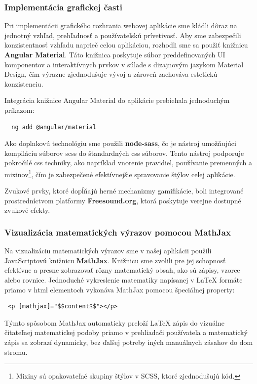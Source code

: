 \subsubsection*{Implementácia grafickej časti}
Pri implementácii grafického rozhrania webovej aplikácie sme kládli dôraz na jednotný vzhľad, prehľadnosť a používateľskú prívetivosť.
 Aby sme zabezpečili konzistentnosť vzhľadu naprieč celou aplikáciou, rozhodli sme sa použiť knižnicu \textbf{Angular Material}.
  Táto knižnica poskytuje súbor preddefinovaných UI komponentov a interaktívnych prvkov v súlade s dizajnovým jazykom Material Design, čím výrazne zjednodušuje vývoj a zároveň zachováva estetickú konzistenciu.

Integrácia knižnice Angular Material do aplikácie prebiehala jednoduchým príkazom:

\begin{verbatim}
  ng add @angular/material
\end{verbatim}

Ako doplnkovú technológiu sme použili \textbf{node-sass}, čo je nástroj umožňujúci kompiláciu súborov \acrshort{scss} do štandardných \acrshort{css} súborov.
 Tento nástroj podporuje pokročilé \acrshort{css} techniky, ako napríklad vnorenie pravidiel, používanie premenných a mixinov\footnote{Mixiny sú opakovateľné skupiny štýlov v SCSS, ktoré zjednodušujú kód.}, čím je zabezpečené efektívnejšie spravovanie štýlov celej aplikácie.

 Zvukové prvky, ktoré dopĺňajú herné mechanizmy gamifikácie, boli integrované prostredníctvom platformy \textbf{Freesound.org}\cite{freesong}, ktorá poskytuje verejne dostupné zvukové efekty.
 
 \subsubsection*{Vizualizácia matematických výrazov pomocou MathJax }
 Na vizualizáciu matematických výrazov sme v našej aplikácii použili JavaScriptovú knižnicu \textbf{MathJax}. 
 Knižnicu sme zvolili pre jej schopnosť efektívne a presne zobrazovať rôzny matematický obsah, ako sú zápisy, vzorce alebo rovnice. 
 Jednoduché vykreslenie matematiky napísanej v LaTeX formáte priamo v \acrshort{html} elementoch vykonáva MathJax pomocou špeciálnej property:

\begin{verbatim}
 <p [mathjax]="$$content$$"></p>
  \end{verbatim}
 Týmto spôsobom MathJax automaticky preloží LaTeX zápis do vizuálne čitateľnej matematickej podoby priamo v prehliadači používateľa a matematický zápis sa zobrazí dynamicky, bez ďalšej potreby iných manuálnych zásahov do \acrshort{dom} stromu.

